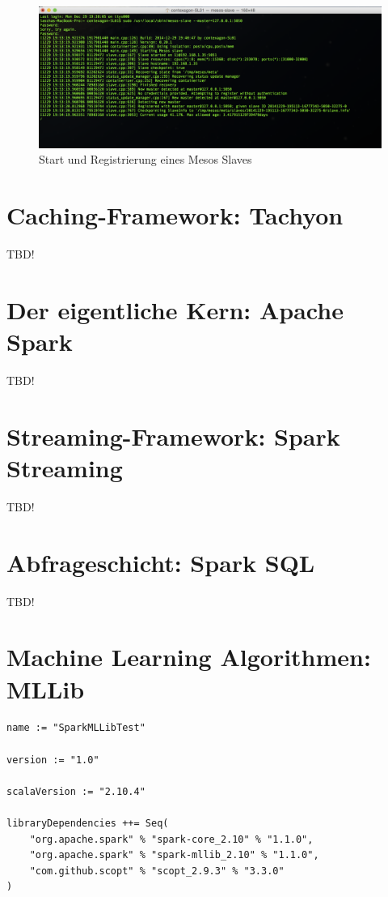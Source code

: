 \begin{figure}[htb!]
\centering
\includegraphics[width=1.0\textwidth]{bilder/mesos_start.png}
\caption{Start und Registrierung eines Mesos Slaves}
\label{fig:mesos slave]}
\end{figure} 

\section{Caching-Framework: Tachyon}
\label{section:tachyon}

TBD!
\section{Der eigentliche Kern: Apache Spark}
\label{section:kern}

TBD!

\section{Streaming-Framework: Spark Streaming}
\label{section:streaming}

TBD!

\section{Abfrageschicht: Spark SQL}
\label{section:spark sql}

TBD!

\section{Machine Learning Algorithmen: MLLib}
\label{section:mllib arch}

\begin{lstlisting}[label=setup mllibs,caption=SBT Script für Anwendungen mit Spark und MLLib-Dependencies]
name := "SparkMLLibTest"

version := "1.0"

scalaVersion := "2.10.4"

libraryDependencies ++= Seq(
    "org.apache.spark" % "spark-core_2.10" % "1.1.0",
    "org.apache.spark" % "spark-mllib_2.10" % "1.1.0",
    "com.github.scopt" % "scopt_2.9.3" % "3.3.0"
)

\end{lstlisting}




